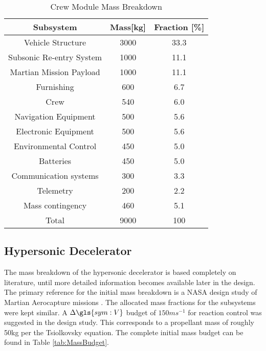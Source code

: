 \begin{table}[H]
	\centering
	\caption{Crew Module Mass Breakdown}
	\begin{tabular}{|c|c|c|}
    \hline
    Subsystem        					& Mass[kg] 	& Fraction [\%] \\ \hline \hline
    Vehicle Structure 				& 3000			& 33.3 					\\ \hline 
		Subsonic Re-entry System	& 1000			& 11.1					\\ \hline
		Martian Mission Payload 	& 1000			& 11.1 					\\ \hline
		Furnishing								& 600				& 6.7 					\\ \hline
		Crew											& 540				& 6.0						\\ \hline
		Navigation Equipment			& 500				& 5.6						\\ \hline
		Electronic Equipment 			& 500				& 5.6						\\ \hline
		Environmental Control			& 450				& 5.0						\\ \hline
		Batteries									&	450				&	5.0						\\ \hline
		Communication systems			& 300				& 3.3						\\ \hline
		Telemetry									& 200				& 2.2						\\ \hline
		Mass contingency					&	460				& 5.1						\\ \hline
		Total											&	9000			& 100						\\ \hline
    \end{tabular}
    \label{tab:CVMB}
\end{table}

\subsection{Hypersonic Decelerator}
The mass breakdown of the hypersonic decelerator is based completely on literature, until more detailed information becomes available later in the design. The primary reference for the initial mass breakdown is a NASA design study of Martian Aerocapture missions \cite{Cianciolo2010}. The allocated mass fractions for the subsystems were kept similar. A $\Delta \gls{sym:V}$ budget of $150 ms^{-1}$ for reaction control was suggested in the design study. This corresponds to a propellant mass of roughly 50kg per the Tsiolkovsky equation. The complete initial mass budget can be found in Table \ref{tab:MassBudget}. 

